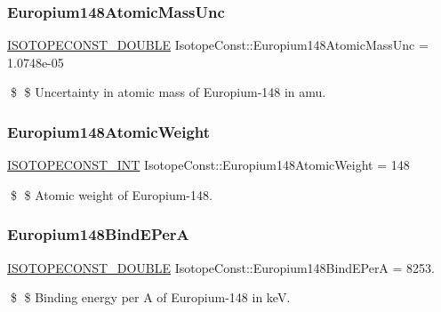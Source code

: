 \subsubsection{\texorpdfstring{Europium148\+Atomic\+Mass\+Unc}{Europium148AtomicMassUnc}}
{\footnotesize\ttfamily \mbox{\hyperlink{group___isotope_const-_macros_ga8f45a7272ce02c0b4c65c44636ed719a}{I\+S\+O\+T\+O\+P\+E\+C\+O\+N\+S\+T\+\_\+\+D\+O\+U\+B\+LE}} Isotope\+Const\+::\+Europium148\+Atomic\+Mass\+Unc = 1.\+0748e-\/05}

\$ \$ Uncertainty in atomic mass of Europium-\/148 in amu. \mbox{\label{group___isotope_const-_europium-_eu148_gafc4b1e58331433f44269e6c90a99a499}} 
\subsubsection{\texorpdfstring{Europium148\+Atomic\+Weight}{Europium148AtomicWeight}}
{\footnotesize\ttfamily \mbox{\hyperlink{group___isotope_const-_macros_ga5f18360b3e99483a35c32d789e62621c}{I\+S\+O\+T\+O\+P\+E\+C\+O\+N\+S\+T\+\_\+\+I\+NT}} Isotope\+Const\+::\+Europium148\+Atomic\+Weight = 148}

\$ \$ Atomic weight of Europium-\/148. \mbox{\label{group___isotope_const-_europium-_eu148_ga7421090692ec7269be16b6e7ac0f1bd7}} 
\subsubsection{\texorpdfstring{Europium148\+Bind\+E\+PerA}{Europium148BindEPerA}}
{\footnotesize\ttfamily \mbox{\hyperlink{group___isotope_const-_macros_ga8f45a7272ce02c0b4c65c44636ed719a}{I\+S\+O\+T\+O\+P\+E\+C\+O\+N\+S\+T\+\_\+\+D\+O\+U\+B\+LE}} Isotope\+Const\+::\+Europium148\+Bind\+E\+PerA = 8253.}

\$ \$ Binding energy per A of Europium-\/148 in keV. \mbox{\label{group___isotope_const-_europium-_eu148_ga94828f40ebbd4819b3c787accac7980f}} 
